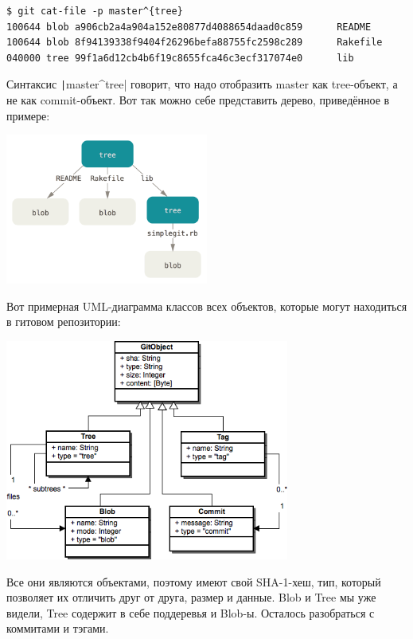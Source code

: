 \documentclass{../../text-style}
\begin{document}
\begin{verbatim}
$ git cat-file -p master^{tree}
100644 blob a906cb2a4a904a152e80877d4088654daad0c859      README
100644 blob 8f94139338f9404f26296befa88755fc2598c289      Rakefile
040000 tree 99f1a6d12cb4b6f19c8655fca46c3ecf317074e0      lib
\end{verbatim}

Синтаксис \texttt|master^{tree}| говорит, что надо отобразить master как tree-объект, а не как commit-объект. Вот так можно себе представить дерево, приведённое в примере:

\begin{center}
    \includegraphics[width=0.5\textwidth]{gitTreeObject.png}
\end{center}

Вот примерная UML-диаграмма классов всех объектов, которые могут находиться в гитовом репозитории:
\begin{center}
    \includegraphics[width=0.7\textwidth]{gitDataStructure.png}
\end{center}

Все они являются объектами, поэтому имеют свой SHA-1-хеш, тип, который позволяет их отличить друг от друга, размер и данные. Blob и Tree мы уже видели, Tree содержит в себе поддеревья и Blob-ы. Осталось разобраться с коммитами и тэгами. 
\end{document}
